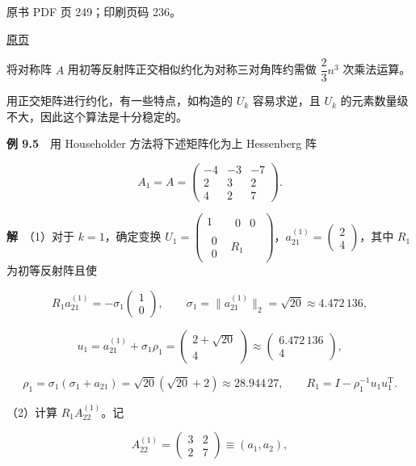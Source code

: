 \clearpage

原书 PDF 页 249；印刷页码 236。

\href{source-images/pdf-249.jpeg}{原页}

将对称阵 \(A\) 用初等反射阵正交相似约化为对称三对角阵约需做 \(\dfrac23n^3\) 次乘法运算。

用正交矩阵进行约化，有一些特点，如构造的 \(U_k\) 容易求逆，且 \(U_k\) 的元素数量级不大，因此这个算法是十分稳定的。

\textbf{例 9.5}　用 Householder 方法将下述矩阵化为上 Hessenberg 阵

\[
A_1=A=\begin{pmatrix}-4&-3&-7\\2&3&2\\4&2&7\end{pmatrix}.
\]

\textbf{解}　（1）对于 \(k=1\)，确定变换 \(U_1=\begin{pmatrix}1&\begin{matrix}0&0\end{matrix}\\\begin{matrix}0\\0\end{matrix}&R_1\end{pmatrix}\)，\(a_{21}^{(1)}=\begin{pmatrix}2\\4\end{pmatrix}\)，其中 \(R_1\) 为初等反射阵且使

\[
R_1a_{21}^{(1)}=-\sigma_1\begin{pmatrix}1\\0\end{pmatrix},\qquad
\sigma_1=\|a_{21}^{(1)}\|_2=\sqrt{20}\approx4.472\,136,
\]

\[
u_1=a_{21}^{(1)}+\sigma_1\rho_1=\begin{pmatrix}2+\sqrt{20}\\4\end{pmatrix}
\approx\begin{pmatrix}6.472\,136\\4\end{pmatrix},
\]

\[
\rho_1=\sigma_1(\sigma_1+a_{21})=\sqrt{20}(\sqrt{20}+2)\approx28.944\,27,\qquad
R_1=I-\rho_1^{-1}u_1u_1^{\mathrm T}.
\]

（2）计算 \(R_1A_{22}^{(1)}\)。记

\[
A_{22}^{(1)}=\begin{pmatrix}3&2\\2&7\end{pmatrix}\equiv(a_1,a_2),
\]


